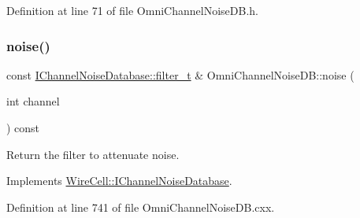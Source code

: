 Definition at line 71 of file Omni\+Channel\+Noise\+D\+B.\+h.

\mbox{\label{class_wire_cell_1_1_sig_proc_1_1_omni_channel_noise_d_b_a125b09b4d7d5cb973ae418936343bf4a}} 
\subsubsection{\texorpdfstring{noise()}{noise()}}
{\footnotesize\ttfamily const \hyperlink{class_wire_cell_1_1_i_channel_noise_database_a0acbae29743542eb1c652f7a56e692f5}{I\+Channel\+Noise\+Database\+::filter\+\_\+t} \& Omni\+Channel\+Noise\+D\+B\+::noise (\begin{DoxyParamCaption}\item[{int}]{channel }\end{DoxyParamCaption}) const\hspace{0.3cm}{\ttfamily [virtual]}}



Return the filter to attenuate noise. 



Implements \hyperlink{class_wire_cell_1_1_i_channel_noise_database_a1197551d9dcfd6dc8f656a8aecd5b962}{Wire\+Cell\+::\+I\+Channel\+Noise\+Database}.



Definition at line 741 of file Omni\+Channel\+Noise\+D\+B.\+cxx.

